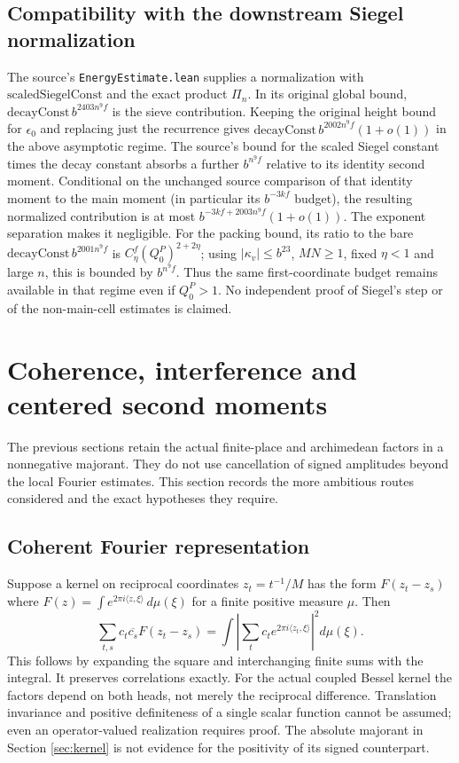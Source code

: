 \documentclass[11pt,a4paper]{article}
\begin{document}
\subsection{Compatibility with the downstream Siegel normalization}
The source's \texttt{EnergyEstimate.lean} \cite{energy} supplies a normalization with $\mathrm{scaledSiegelConst}$ and the exact product $\Pi_n$. In its original global bound, $\mathrm{decayConst}\,b^{2403n^9f}$ is the sieve contribution. Keeping the original height bound for $\epsilon_0$ and replacing just the recurrence gives $\mathrm{decayConst}\,b^{2002n^9f}(1+o(1))$ in the above asymptotic regime. The source's bound for the scaled Siegel constant times the decay constant absorbs a further $b^{n^9f}$ relative to its identity second moment. Conditional on the unchanged source comparison of that identity moment to the main moment (in particular its $b^{-3kf}$ budget), the resulting normalized contribution is at most $b^{-3kf+2003n^9f}(1+o(1))$. The exponent separation makes it negligible. For the packing bound, its ratio to the bare $\mathrm{decayConst}\,b^{2001n^9f}$ is $C_\eta^f(Q_0^P)^{2+2\eta}$; using $|\kappa_v|\leq b^{23}$, $MN\geq1$, fixed $\eta<1$ and large $n$, this is bounded by $b^{n^9f}$. Thus the same first-coordinate budget remains available in that regime even if $Q_0^P>1$. No independent proof of Siegel's step or of the non-main-cell estimates is claimed.
\section{Coherence, interference and centered second moments}\label{sec:coherence}
The previous sections retain the actual finite-place and archimedean factors in a nonnegative majorant. They do not use cancellation of signed amplitudes beyond the local Fourier estimates. This section records the more ambitious routes considered and the exact hypotheses they require.

\subsection{Coherent Fourier representation}
Suppose a kernel on reciprocal coordinates $z_t=t^{-1}/M$ has the form $F(z_t-z_s)$ where $F(z)=\int e^{2\pi i\langle z,\xi\rangle}\,d\mu(\xi)$ for a finite positive measure $\mu$. Then
\begin{equation}\label{eq:coherent}
\sum_{t,s}c_t\overline{c_s}F(z_t-z_s)=\int\left|\sum_t c_t e^{2\pi i\langle z_t,\xi\rangle}\right|^2d\mu(\xi).
\end{equation}
This follows by expanding the square and interchanging finite sums with the integral. It preserves correlations exactly. For the actual coupled Bessel kernel the factors depend on both heads, not merely the reciprocal difference. Translation invariance and positive definiteness of a single scalar function cannot be assumed; even an operator-valued realization requires proof. The absolute majorant in Section \ref{sec:kernel} is not evidence for the positivity of its signed counterpart.
\end{document}
